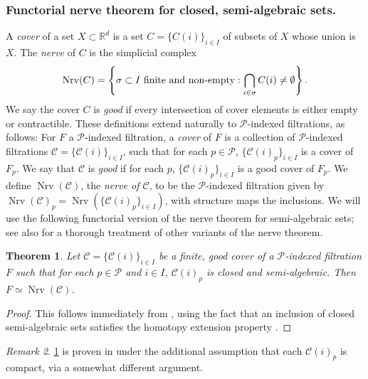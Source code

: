 \documentclass[11pt]{amsart}
\newcommand{\R}{\mathbb{R}} %
\DeclareMathOperator{\Nrv}{Nrv}
\newcommand{\deff}{\emph}
\renewcommand{\subparagraph}[1]{\subsubsection*{\textbf{\textup{#1}}}}
\theoremstyle{plain}
\newtheorem{theorem}{Theorem}[section]
\theoremstyle{definition}
\theoremstyle{remark}
\newtheorem{remark}[theorem]{Remark}
\begin{document}
%
\subparagraph{Functorial nerve theorem for closed, semi-algebraic sets.}
A \deff{cover}  of a set  $X\subset \R^d$ is a set $C = \{C(i)\}_{i \in I} $ of subsets of $X$ whose union is $X$.
The \deff{nerve} of $C$ is the simplicial complex \[ \Nrv(C) = \left\{ \sigma \subset I \textup{ finite and non-empty} :  \bigcap\limits_{i\in \sigma}{ C(i) } \neq \emptyset \right\}.\]
We say the cover $C$ is \deff{good} if every intersection of cover elements is either empty or contractible. 
%
These definitions extend naturally to $\mathcal{P}$-indexed filtrations, as follows: For $F$ a $\mathcal{P}$-indexed filtration, a \deff{cover} of $F$ is a collection of $\mathcal{P}$-indexed filtrations $\mathcal C = \{\mathcal C{(i)}\}_{i \in I} $, such that for each $p\in \mathcal P$, $\{\mathcal C(i)_p\}_{i\in I}$ is a cover of $F_p$.  We say that $\mathcal C $ is \deff{good} if for each $p$, $\{\mathcal C(i)_p\}_{i\in I}$ is a good cover of $F_p$. We define $\Nrv(\mathcal C)$, the \emph{nerve of $\mathcal C$}, to be the $\mathcal{P}$-indexed filtration given by 
$\Nrv(\mathcal C)_p=\Nrv(\{\mathcal C(i)_p\}_{i\in I})$, with structure maps the inclusions.
%
We will use the following functorial version of the nerve theorem for semi-algebraic sets; see also  \cite{bauerUnifiedViewFunctorial2023} for a thorough treatment of other variants of the nerve theorem.  
%
\begin{theorem}\label{Thm:Nerve_Semi_algebraic}
Let $\mathcal C=\{\mathcal C(i)\}_{i\in I}$ be a finite, good cover of a $\mathcal{P}$-indexed filtration $F$ such that 
for each $p\in \mathcal {P}$ and $i\in I$, $\mathcal{C}(i)_p$ is closed and semi-algebraic.  Then $F\simeq \Nrv(\mathcal C)$.  
\end{theorem}
%
\begin{proof}
This follows immediately from \cite[Theorem 5.9]{bauerUnifiedViewFunctorial2023}, using the fact that an inclusion of closed semi-algebraic sets satisfies the homotopy extension property \cite[Theorem 4]{delfs1984separation}.
\end{proof}
%
\begin{remark} \cref{Thm:Nerve_Semi_algebraic} is proven in \cite[Theorem 4.10]{bauerUnifiedViewFunctorial2023} under the additional assumption that each $\mathcal{C}(i)_p$ is compact, via a somewhat different argument.
\end{remark}
%
\end{document}
